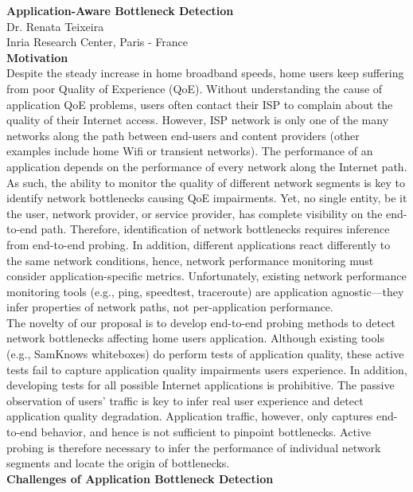 \documentclass[11 pt]{article}
\begin{document}
\noindent \textbf{Application-Aware Bottleneck Detection}\\
Dr. Renata Teixeira \\
Inria Research Center, Paris - France\\

\noindent \textbf{Motivation}\\

Despite the steady increase in home broadband speeds, home users keep suffering from poor Quality of Experience (QoE). Without understanding the cause of application QoE problems, users often contact their ISP to complain about the quality of their Internet access. However, ISP network is only one of the many networks along the path between end-users and content providers (other examples include home Wifi or transient networks). The performance of an application depends on the performance of every network along the Internet path. As such, the ability to monitor the quality of different network segments is key to identify network bottlenecks causing QoE impairments. Yet, no single entity, be it the user, network provider, or service provider, has complete visibility on the end-to-end path. Therefore, identification of network bottlenecks requires inference from end-to-end probing. In addition, different applications react differently to the same network conditions, hence, network performance monitoring must consider application-specific metrics. Unfortunately, existing network performance monitoring tools (e.g., ping, speedtest, traceroute) are application agnostic---they infer properties of network paths, not per-application performance.\\

The novelty of our proposal is to develop end-to-end probing methods to detect network bottlenecks affecting home users application. Although existing tools (e.g., SamKnows whiteboxes) do perform tests of application quality, these active tests fail to capture application quality impairments users experience. In addition, developing tests for all possible Internet applications is prohibitive. The passive observation of users' traffic is key to infer real user experience and detect application quality degradation. Application traffic, however, only captures end-to-end behavior, and hence is not sufficient to pinpoint bottlenecks. Active probing is therefore necessary to infer the performance of individual network segments and locate the origin of bottlenecks.\\

\noindent \textbf{Challenges of Application Bottleneck Detection}\\
\end{document}
